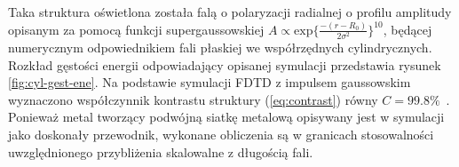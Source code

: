 Taka struktura oświetlona została falą o polaryzacji radialnej o profilu amplitudy opisanym za pomocą funkcji supergaussowskiej $A \propto \textrm{exp}\{\frac{-(r-R_0)}{2\sigma^2}\}^{10}$, będącej numerycznym odpowiednikiem fali płaskiej we współrzędnych cylindrycznych. Rozkład gęstości energii odpowiadający opisanej symulacji przedstawia rysunek \ref{fig:cyl-gest-ene}. Na podstawie symulacji FDTD z impulsem gaussowskim wyznaczono współczynnik kontrastu struktury (\ref{eq:contrast}) równy $C=99.8\%$~\cite{Yavorskiy:14}. Ponieważ metal tworzący podwójną siatkę metalową opisywany jest w symulacji jako doskonały przewodnik, wykonane obliczenia są w granicach stosowalności uwzględnionego przybliżenia skalowalne z długością fali.
